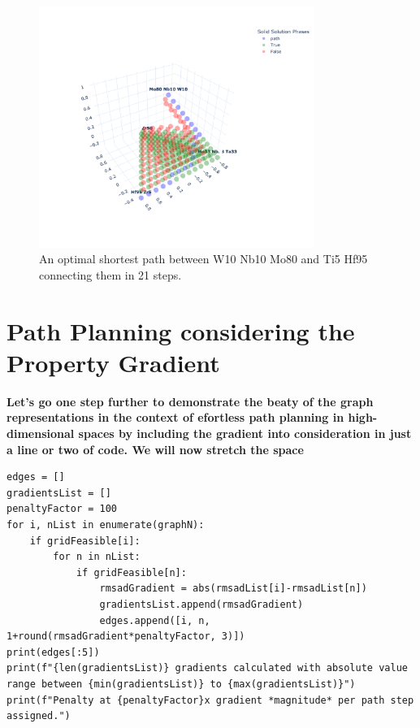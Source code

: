 \begin{figure}[H]
    \centering
    \includegraphics[width=0.8\textwidth]{nimplextutorial2/02.AdditiveManufacturingPathPlanning_58_1.pdf}
    \caption{An optimal shortest path between W10 Nb10 Mo80 and Ti5 Hf95 connecting them in 21 steps.}
    \label{nimplextutorial2:fig:shortest}
\end{figure}


\section{Path Planning considering the Property
Gradient}\label{nimplextutorial2:path-planning-considering-the-property-gradient}

\textbf{Let's go one step further to demonstrate the beaty of the graph
representations in the context of efortless path planning in
high-dimensional spaces by including the gradient into consideration in
just a line or two of code. We will now stretch the space}

\begin{verbatim}
edges = []
gradientsList = []
penaltyFactor = 100
for i, nList in enumerate(graphN):
    if gridFeasible[i]:
        for n in nList:
            if gridFeasible[n]:
                rmsadGradient = abs(rmsadList[i]-rmsadList[n])
                gradientsList.append(rmsadGradient)
                edges.append([i, n, 1+round(rmsadGradient*penaltyFactor, 3)])
print(edges[:5])
print(f"{len(gradientsList)} gradients calculated with absolute value range between {min(gradientsList)} to {max(gradientsList)}")
print(f"Penalty at {penaltyFactor}x gradient *magnitude* per path step assigned.")
\end{verbatim}

